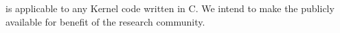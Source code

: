\tool is applicable to any Kernel code written in C. We intend to make the \tool publicly available for benefit of the research community.


